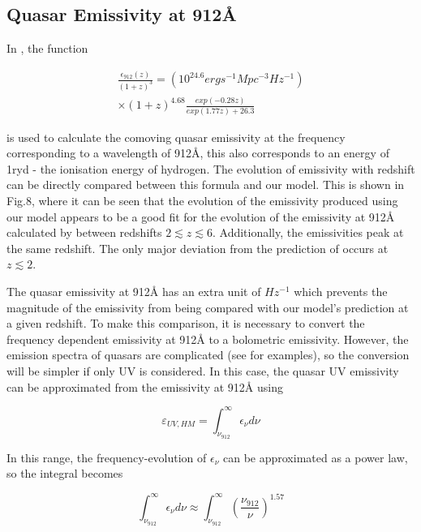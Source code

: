\documentclass[12pt, twocolumn]{report}%
\begin{document}
\subsection{Quasar Emissivity at 912\AA}

In \cite{Haardt_Madau}, the function

\begin{multline}
    \frac{\epsilon_{912}(z)}{(1+z)^3}=(10^{24.6}erg s^{-1}Mpc^{-3}Hz^{-1})\\
    \times(1+z)^{4.68}\frac{exp(-0.28z)}{exp(1.77z)+26.3}
\end{multline}

\noindent is used to calculate the comoving quasar emissivity at the frequency corresponding to a wavelength of 912\AA, this also corresponds to an energy of 1ryd - the ionisation energy of hydrogen. The evolution of emissivity with redshift can be directly compared between this formula and our model. This is shown in Fig.8, where it can be seen that the evolution of the emissivity produced using our model appears to be a good fit for the evolution of the emissivity at 912\AA \: calculated by \cite{Haardt_Madau} between redshifts $2\lesssim z\lesssim6$. Additionally, the emissivities peak at the same redshift. The only major deviation from the prediction of \citeauthor{Haardt_Madau} occurs at $z\lesssim2$.\par

The quasar emissivity at 912\AA \: has an extra unit of $Hz^{-1}$ which prevents the magnitude of the emissivity from being compared with our model's prediction at a given redshift. To make this comparison, it is necessary to convert the frequency dependent emissivity at 912\AA \: to a bolometric emissivity. However, the emission spectra of quasars are complicated (see \cite{QSO_Spectrum} for examples), so the conversion will be simpler if only UV is considered. In this case, the quasar UV emissivity can be approximated from the emissivity at 912\AA \: using

\begin{equation}
    \varepsilon_{UV,HM}=\int_{\nu_{912}}^{\infty}\epsilon_\nu d\nu
\end{equation}

\noindent In this range, the frequency-evolution of $\epsilon_\nu$ can be approximated as a power law, so the integral becomes

\begin{equation}
    \int_{\nu_{912}}^{\infty}\epsilon_\nu d\nu\approx\int_{\nu_{912}}^{\infty}\left(\frac{\nu_{912}}{\nu}\right)^{1.57}
\end{equation}
\end{document}
